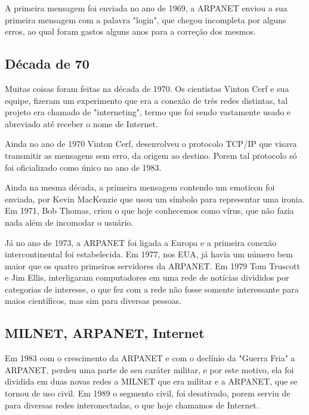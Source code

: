 \documentclass[
	12pt,				%
	openright,			%
	twoside,			%
	a4paper,			%
	Times,
	brazil,				%
	]{abntex2}
\begin{document}
A primeira mensagem foi enviada no ano de 1969, a ARPANET enviou a sua primeira mensagem com a palavra "login", que chegou incompleta por alguns erros, ao qual foram gastos alguns anos para a correção dos mesmos. \cite{historia-internt}
\par

\subsection{Década de 70}

Muitas coisas foram feitas na década de 1970. Os cientistas Vinton Cerf e sua equipe, fizeram um experimento que era a conexão de três redes distintas, tal projeto era chamado de "interneting", termo que foi sendo vastamente usado e abreviado até receber o nome de Internet. \cite{historia-internt}
\par

Ainda no ano de 1970 Vinton Cerf, desenvolveu o protocolo TCP/IP que visava transmitir as mensagens sem erro, da origem ao destino. Porem tal protocolo só foi oficializado como único no ano de  1983.\cite{historia-internt}
\par

Ainda na mesma década, a primeira mensagem contendo um emoticon foi enviada, por Kevin MacKenzie que usou um símbolo para representar uma ironia. Em 1971, Bob Thomas, criou o que hoje conhecemos como vírus, que não fazia nada além de incomodar o usuário. \cite{historia-internt}
\par

Já no ano de 1973, a ARPANET foi ligada a Europa e a primeira conexão intercontinental foi estabelecida. Em 1977, nos EUA, já havia um número bem maior que os quatro primeiros servidores da ARPANET. Em 1979 Tom Truscott e Jim Ellis, interligaram computadores em uma rede de notícias divididos por categorias de interesse, o que fez com a rede não fosse somente interessante para maios científicos, mas sim para diversas pessoas.  \cite{historia-internt}
\par


\subsection{MILNET, ARPANET, Internet}

Em 1983 com o crescimento da ARPANET e com o declínio da "Guerra Fria" a ARPANET, perdeu uma parte de seu caráter militar, e por este motivo, ela foi dividida em duas novas redes a MILNET que era militar e a ARPANET, que se tornou de uso civil. Em 1989 o segmento civil, foi desativado, porem serviu de para diversas redes interonectadas, o que hoje chamamos de Internet. \cite{historia-internt, web}
\par
\end{document}
